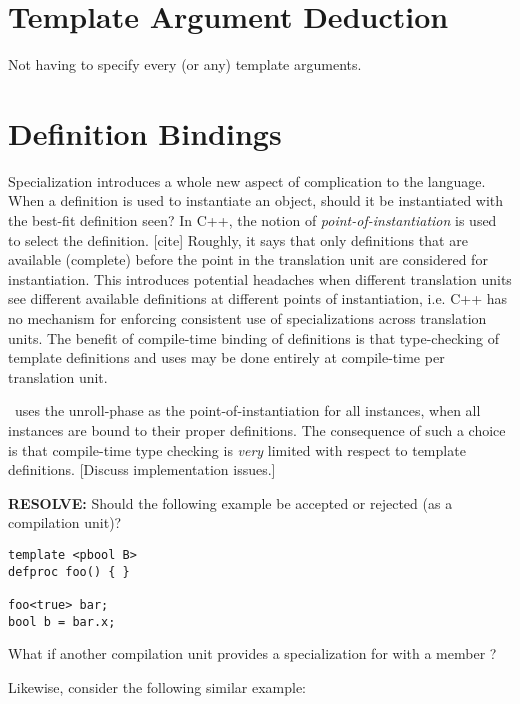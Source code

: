 \section{Template Argument Deduction}
\label{sec:templates:deduction}

Not having to specify every (or any) template arguments.

\section{Definition Bindings}
\label{sec:templates:bind}

Specialization introduces a whole new aspect of complication to the language.  
When a definition is used to instantiate an object, should it be 
instantiated with the best-fit definition seen?  
In C++, the notion of \emph{point-of-instantiation} is used to 
select the definition.  [cite]
Roughly, it says that only definitions that are available (complete)
before the point in the translation unit are considered for instantiation.  
This introduces potential headaches when different translation units
see different available definitions at different points of instantiation, 
i.e. C++ has no mechanism for enforcing consistent use of specializations
across translation units.  
The benefit of compile-time binding of definitions is that type-checking
of template definitions and uses may be done entirely at compile-time
per translation unit.  

\hac\ uses the unroll-phase as the point-of-instantiation for all 
instances, when all instances are bound to their proper definitions.  
The consequence of such a choice is that compile-time type checking
is \emph{very} limited with respect to template definitions.  
[Discuss implementation issues.]

\textbf{RESOLVE:}
Should the following example be accepted or rejected (as a compilation unit)?

\begin{verbatim}
template <pbool B>
defproc foo() { }

foo<true> bar;
bool b = bar.x;
\end{verbatim}

What if another compilation unit provides a specialization for 
 with a  member ?

Likewise, consider the following similar example:

